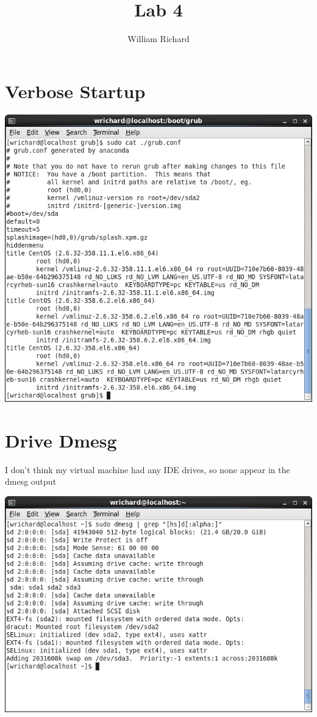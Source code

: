 \documentclass[a4paper,10pt]{article}
\title{Lab 4}
\author{William Richard}
\begin{document}
\maketitle

\section{Verbose Startup}
  \begin{center}
  \includegraphics[width=\linewidth]{./verbose-grubconf.png}
  \end{center}

\section{Drive Dmesg}
I don't think my virtual machine had any IDE drives, so none appear in the dmesg output
  \begin{center}
  \includegraphics[width=\linewidth]{./dmesg-drives.png}
  \end{center}
\end{document}
